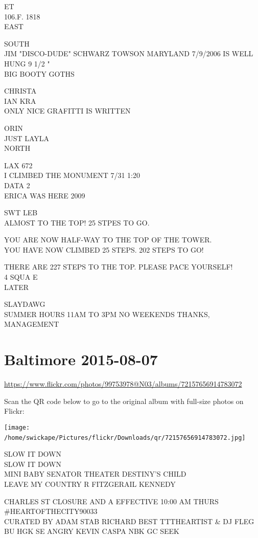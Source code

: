 \documentclass[10pt,letterpaper]{article}
\begin{document}
ET\\
106.F. 1818\\
EAST

SOUTH\\
JIM "DISCO{-}DUDE" SCHWARZ TOWSON MARYLAND 7/9/2006 IS WELL HUNG 9 1/2 "\\
BIG BOOTY GOTHS

CHRISTA\\
IAN KRA\\
ONLY NICE GRAFITTI IS WRITTEN

ORIN\\
JUST LAYLA\\
NORTH

LAX 672\\
I CLIMBED THE MONUMENT 7/31 1:20\\
DATA 2\\
ERICA WAS HERE 2009

SWT LEB\\
ALMOST TO THE TOP!  25 STPES TO GO.

YOU ARE NOW HALF{-}WAY TO THE TOP OF THE TOWER.\\
YOU HAVE NOW CLIMBED 25 STEPS.  202 STEPS TO GO!

THERE ARE 227 STEPS TO THE TOP.  PLEASE PACE YOURSELF!\\
4 SQUA E\\
LATER

SLAYDAWG\\
SUMMER HOURS 11AM TO 3PM NO WEEKENDS THANKS, MANAGEMENT
\

\section*{Baltimore 2015-08-07}

\url{https://www.flickr.com/photos/99753978@N03/albums/72157656914783072}

Scan the QR code below to go to the original album with full-size photos on Flickr:

\texttt{[image: /home/swickape/Pictures/flickr/Downloads/qr/72157656914783072.jpg]}
\

SLOW IT DOWN\\
SLOW IT DOWN\\
MINI BABY SENATOR THEATER DESTINY'S CHILD\\
LEAVE MY COUNTRY R FITZGERAIL KENNEDY

CHARLES ST CLOSURE AND A EFFECTIVE 10:00 AM THURS\\
\#HEARTOFTHECITY90033\\
CURATED BY ADAM STAB RICHARD BEST TTTHEARTIST \& DJ FLEG\\
BU HGK SE ANGRY KEVIN CASPA NBK GC SEEK
\end{document}
